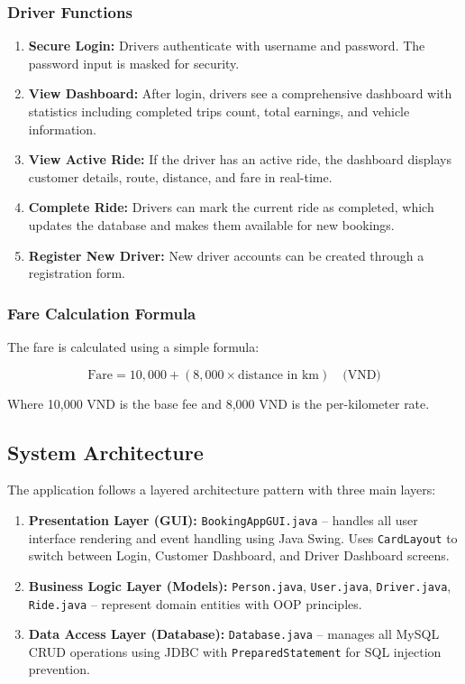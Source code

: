 \documentclass[fonts]{icst}
\begin{document}
\subsubsection{Driver Functions}
\begin{enumerate}
    \item \textbf{Secure Login:} Drivers authenticate with username and password. The password input is masked for security.
    \item \textbf{View Dashboard:} After login, drivers see a comprehensive dashboard with statistics including completed trips count, total earnings, and vehicle information.
    \item \textbf{View Active Ride:} If the driver has an active ride, the dashboard displays customer details, route, distance, and fare in real-time.
    \item \textbf{Complete Ride:} Drivers can mark the current ride as completed, which updates the database and makes them available for new bookings.
    \item \textbf{Register New Driver:} New driver accounts can be created through a registration form.
\end{enumerate}

\subsubsection{Fare Calculation Formula}

The fare is calculated using a simple formula:

\begin{equation}
    \text{Fare} = 10{,}000 + (8{,}000 \times \text{distance in km}) \quad \text{(VND)}
\end{equation}

Where 10,000 VND is the base fee and 8,000 VND is the per-kilometer rate.

\subsection{System Architecture}

The application follows a layered architecture pattern with three main layers:

\begin{enumerate}
    \item \textbf{Presentation Layer (GUI):} \texttt{BookingAppGUI.java} -- handles all user interface rendering and event handling using Java Swing. Uses \texttt{CardLayout} to switch between Login, Customer Dashboard, and Driver Dashboard screens.
    \item \textbf{Business Logic Layer (Models):} \texttt{Person.java}, \texttt{User.java}, \texttt{Driver.java}, \texttt{Ride.java} -- represent domain entities with OOP principles.
    \item \textbf{Data Access Layer (Database):} \texttt{Database.java} -- manages all MySQL CRUD operations using JDBC with \texttt{PreparedStatement} for SQL injection prevention.
\end{enumerate}
\end{document}
